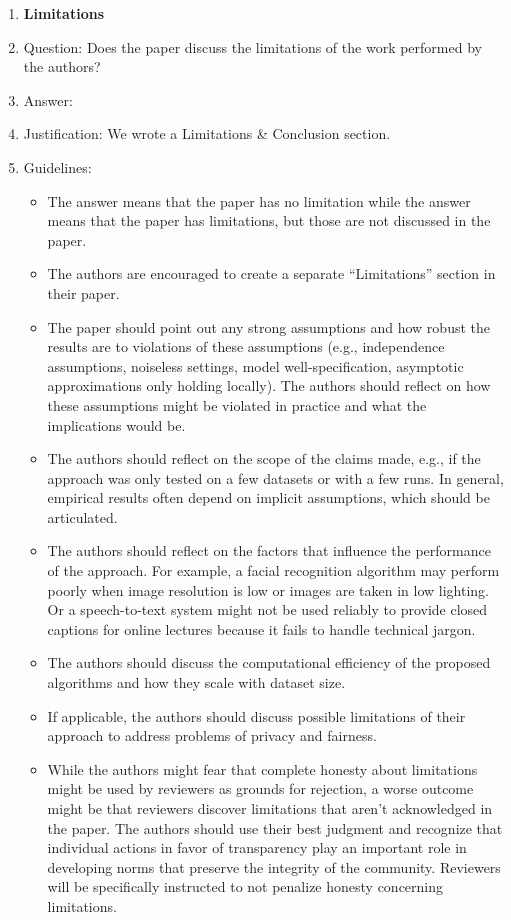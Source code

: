 \documentclass{article}
\theoremstyle{plain}
\theoremstyle{definition}
\theoremstyle{remark}
\begin{document}
\begin{enumerate}
\item {\bf Limitations}
    \item[] Question: Does the paper discuss the limitations of the work performed by the authors?
    \item[] Answer: \answerYes{} %
    \item[] Justification: We wrote a Limitations \& Conclusion section.
    \item[] Guidelines:
    \begin{itemize}
        \item The answer \answerNA{} means that the paper has no limitation while the answer \answerNo{} means that the paper has limitations, but those are not discussed in the paper. 
        \item The authors are encouraged to create a separate ``Limitations'' section in their paper.
        \item The paper should point out any strong assumptions and how robust the results are to violations of these assumptions (e.g., independence assumptions, noiseless settings, model well-specification, asymptotic approximations only holding locally). The authors should reflect on how these assumptions might be violated in practice and what the implications would be.
        \item The authors should reflect on the scope of the claims made, e.g., if the approach was only tested on a few datasets or with a few runs. In general, empirical results often depend on implicit assumptions, which should be articulated.
        \item The authors should reflect on the factors that influence the performance of the approach. For example, a facial recognition algorithm may perform poorly when image resolution is low or images are taken in low lighting. Or a speech-to-text system might not be used reliably to provide closed captions for online lectures because it fails to handle technical jargon.
        \item The authors should discuss the computational efficiency of the proposed algorithms and how they scale with dataset size.
        \item If applicable, the authors should discuss possible limitations of their approach to address problems of privacy and fairness.
        \item While the authors might fear that complete honesty about limitations might be used by reviewers as grounds for rejection, a worse outcome might be that reviewers discover limitations that aren't acknowledged in the paper. The authors should use their best judgment and recognize that individual actions in favor of transparency play an important role in developing norms that preserve the integrity of the community. Reviewers will be specifically instructed to not penalize honesty concerning limitations.
    \end{itemize}


\end{enumerate}
\end{document}
